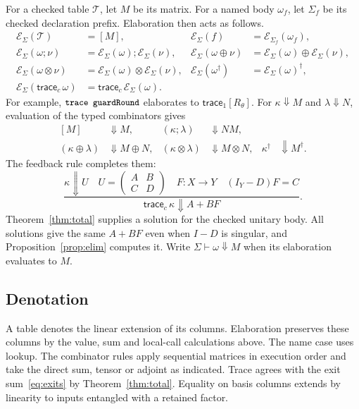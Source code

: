 \documentclass[acmsmall,screen,review,anonymous,nonacm]{acmart}
\newcommand{\C}{\mathbb C}
\newcommand{\storyinlineface}{\small\ttfamily}
\newcommand{\code}[1]{\textnormal{\storyinlineface #1}}
\numberwithin{equation}{section}
\begin{document}
For a checked table $\mathcal T$, let $M$ be its matrix. For a named body
$\omega_f$, let $\Sigma_f$ be its checked declaration prefix. Elaboration
then acts as follows.
\[
\begin{aligned}
 \mathcal E_\Sigma(\mathcal T)&=[M],&
 \mathcal E_\Sigma(f)&=\mathcal E_{\Sigma_f}(\omega_f),\\
 \mathcal E_\Sigma(\omega;\nu)&=\mathcal E_\Sigma(\omega);\mathcal
 E_\Sigma(\nu),&
 \mathcal E_\Sigma(\omega\oplus\nu)&=\mathcal
 E_\Sigma(\omega)\oplus\mathcal E_\Sigma(\nu),\\
 \mathcal E_\Sigma(\omega\otimes\nu)&=\mathcal
 E_\Sigma(\omega)\otimes\mathcal E_\Sigma(\nu),&
 \mathcal E_\Sigma(\omega^\dagger)&=\mathcal
 E_\Sigma(\omega)^\dagger,\\
 \mathcal
 E_\Sigma(\mathsf{trace}_c\,\omega)&=\mathsf{trace}_c\,\mathcal
 E_\Sigma(\omega).
\end{aligned}
\]
For example, $\code{trace guardRound}$ elaborates to $\mathsf{trace}_1[R_\theta]$.
For $\kappa\Downarrow M$ and $\lambda\Downarrow N$, evaluation of the typed
combinators gives
\[
\begin{aligned}
 [M]&\Downarrow M,&(\kappa;\lambda)&\Downarrow NM,\\
(\kappa\oplus\lambda)&\Downarrow M\oplus N,&
(\kappa\otimes\lambda)&\Downarrow M\otimes N,&
 \kappa^\dagger&\Downarrow M^\dagger.
\end{aligned}
\]
The feedback rule completes them:
\[
 \frac{\kappa\Downarrow U\quad
U=\left(\begin{smallmatrix}A&B\\C&D\end{smallmatrix}\right)
       \quad F:X\to Y\quad (I_Y-D)F=C}
      {\mathsf{trace}_c\,\kappa\Downarrow A+BF}.
\]
Theorem~\ref{thm:total} supplies a solution for the checked unitary body.
All solutions give the same $A+BF$ even when $I-D$ is singular, and
Proposition~\ref{prop:elim} computes it. Write $\Sigma\vdash\omega\Downarrow M$
when its elaboration evaluates to $M$.

\subsection{Denotation}
A table denotes the linear extension of its columns. Elaboration preserves
these columns by the value, sum and local-call calculations above. The
name case uses lookup. The combinator rules apply sequential matrices in execution
order and take the direct sum, tensor or adjoint as indicated.
Trace agrees with the exit sum~\eqref{eq:exits} by Theorem~\ref{thm:total}.
Equality on basis columns extends by linearity to inputs entangled with a
retained factor.
\end{document}
